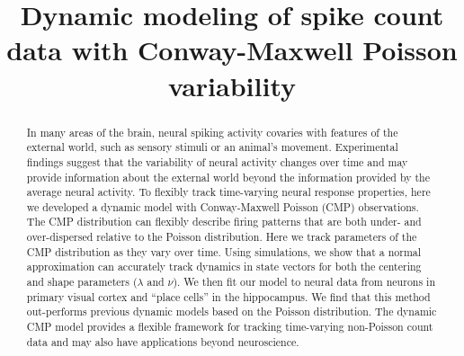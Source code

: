 \documentclass[aoas]{imsart}
\theoremstyle{plain}
\theoremstyle{remark}
\begin{document}
\begin{frontmatter}
\title{Dynamic modeling of spike count data with Conway-Maxwell Poisson variability}


\begin{abstract}
In many areas of the brain, neural spiking activity covaries with features of the external world, such as sensory stimuli or an animal’s movement. Experimental findings suggest that the variability of neural activity changes over time and may provide information about the external world beyond the information provided by the average neural activity. To flexibly track time-varying neural response properties, here we developed a dynamic model with Conway-Maxwell Poisson (CMP) observations. The CMP distribution can flexibly describe firing patterns that are both under- and over-dispersed relative to the Poisson distribution. Here we track parameters of the CMP distribution as they vary over time. Using simulations, we show that a normal approximation can accurately track dynamics in state vectors for both the centering and shape parameters ($\lambda$ and $\nu$). We then fit our model to neural data from neurons in primary visual cortex and “place cells” in the hippocampus. We find that this method out-performs previous dynamic models based on the Poisson distribution. The dynamic CMP model provides a flexible framework for tracking time-varying non-Poisson count data and may also have applications beyond neuroscience.
\end{abstract}

\begin{keyword}
\end{keyword}

\end{frontmatter}
\end{document}
